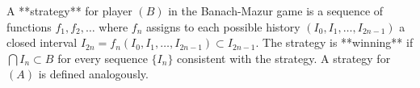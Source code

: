 A **strategy** for player $(B)$ in the Banach-Mazur game is a sequence of functions $f_1, f_2, \ldots$ where $f_n$ assigns to each possible history $(I_0, I_1, \ldots, I_{2n-1})$ a closed interval $I_{2n} = f_n(I_0, I_1, \ldots, I_{2n-1}) \subset I_{2n-1}$. The strategy is **winning** if $\bigcap I_n \subset B$ for every sequence $\{I_n\}$ consistent with the strategy. A strategy for $(A)$ is defined analogously.